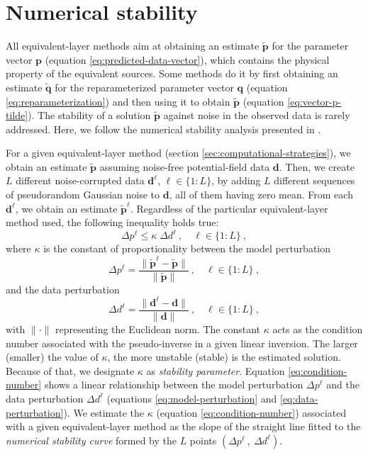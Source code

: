 \section{Numerical stability}

All equivalent-layer methods aim at obtaining an estimate $\tilde{\mathbf{p}}$ for the parameter vector 
$\mathbf{p}$ (equation \ref{eq:predicted-data-vector}), which contains the physical property of the equivalent sources.
Some methods do it by first obtaining an estimate $\tilde{\mathbf{q}}$ for the reparameterized parameter vector $\mathbf{q}$
(equation \ref{eq:reparameterization}) and then using it to obtain $\tilde{\mathbf{p}}$ (equation \ref{eq:vector-p-tilde}).
The stability of a solution $\tilde{\mathbf{p}}$ against noise in the observed data is rarely addressed.
Here, we follow the numerical stability analysis presented in \citet{siqueira-etal2017}.

For a given equivalent-layer method (section \ref{sec:computational-strategies}), we obtain an estimate 
$\tilde{\mathbf{p}}$ assuming noise-free potential-field data $\mathbf{d}$.
Then, we create $L$ different noise-corrupted data $\mathbf{d}^{\ell}$, $\ell \in \{1:L\}$, by adding 
$L$ different sequences of pseudorandom Gaussian noise to $\mathbf{d}$, all of them having zero mean. 
From each $\mathbf{d}^{\ell}$, we obtain an estimate $\tilde{\mathbf{p}}^{\ell}$. 
Regardless of the particular equivalent-layer method used, the following inequality \citep[][ p. 66]{aster_etal2019} 
holds true:
\begin{equation}
	\Delta p^{\ell} \leq \kappa \; \Delta d^{\ell} \: , \quad \ell \in \{1:L\} \: ,
	\label{eq:condition-number}
\end{equation}
where $\kappa$ is the constant of proportionality between the model perturbation
\begin{equation}
	\Delta p^{\ell} = \frac{\| \tilde{\mathbf{p}}^{\ell} - \tilde{\mathbf{p}} \|}{\| \tilde{\mathbf{p}} \|}
	\: , \quad \ell \in \{1:L\} \: ,
	\label{eq:model-perturbation}
\end{equation}
and the data perturbation
\begin{equation}
	\Delta d^{\ell} = \frac{\| \mathbf{d}^{\ell} - \mathbf{d} \|}{\| \mathbf{d} \|}
	\: , \quad \ell \in \{1:L\} \: ,
	\label{eq:data-perturbation}
\end{equation}
with $\| \cdot \|$ representing the Euclidean norm.
The constant $\kappa$ acts as the condition number associated with the pseudo-inverse in a given linear inversion.
The larger (smaller) the value of $\kappa$, the more unstable (stable) is the estimated solution.
Because of that, we designate $\kappa$ as \textit{stability parameter}.
Equation \ref{eq:condition-number} shows a linear relationship between the model perturbation $\Delta p^{\ell}$ and 
the data perturbation $\Delta d^{\ell}$ (equations \ref{eq:model-perturbation} and \ref{eq:data-perturbation}).
We estimate the $\kappa$ (equation \ref{eq:condition-number}) associated with a given 
equivalent-layer method as the slope of the straight line fitted to the \textit{numerical stability curve} formed by the $L$ points 
$\left( \Delta p^{\ell} \: , \: \Delta d^{\ell} \right)$.

